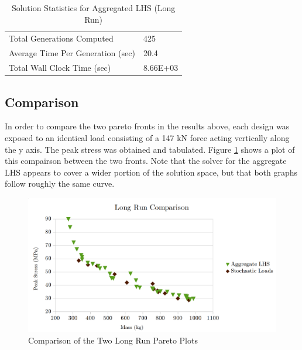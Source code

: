 \begin{table}[!htbp]
  \centering
  \begin{tabular}{|l|l|}
    \hline
	  Total Generations Computed & 425\\
    Average Time Per Generation (sec) & 20.4\\
    Total Wall Clock Time (sec)	 & 8.66E+03\\
    \hline
  \end{tabular}
\caption{Solution Statistics for Aggregated LHS (Long Run)}
  \label{tab:stat_agg_long}
\end{table} 

\subsection{Comparison}
In order to compare the two pareto fronts in the results above, each design was exposed to an identical load consisting of a 147 kN force acting vertically along the y axis. The peak stress was obtained and tabulated. Figure \ref{fig:pfront_comp_long} shows a plot of this compairson between the two fronts. Note that the solver for the aggregate LHS appears to cover a wider portion of the solution space, but that both graphs follow roughly the same curve. 

\begin{figure}[!htbp]
\includegraphics[width=\textwidth]{img/pf_comp_long.png}
\caption{Comparison of the Two Long Run Pareto Plots}
\label{fig:pfront_comp_long}
\end{figure}
